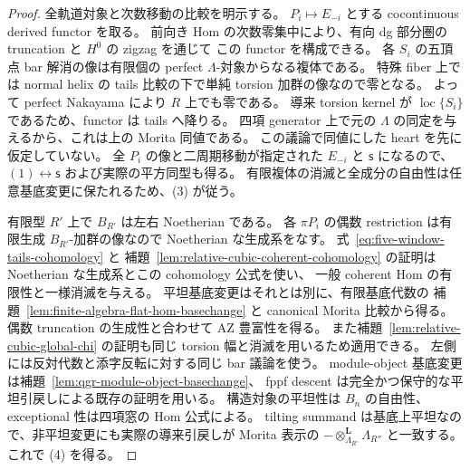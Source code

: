 \begin{proof}
全軌道対象と次数移動の比較を明示する。
$P_i\mapsto E_{-i}$ とする cocontinuous derived functor を取る。
前向き Hom の次数零集中により、有向 dg 部分圏の truncation と $H^0$ の zigzag を通じて
この functor を構成できる。
各 $S_i$ の五頂点 bar 解消の像は有限個の perfect $\Lambda$-対象からなる複体である。
特殊 fiber 上では normal helix の tails 比較の下で単純 torsion 加群の像なので零となる。
よって perfect Nakayama により $R$ 上でも零である。
導来 torsion kernel が $\operatorname{loc}\{S_i\}$ であるため、functor は tails へ降りる。
四項 generator 上で元の $\Lambda$ の同定を与えるから、これは上の Morita 同値である。
この議論で同値にした heart を先に仮定していない。
全 $P_i$ の像と二周期移動が指定された $E_{-i}$ と $\mathsf s$ になるので、
$(1)\leftrightarrow\mathsf s$ および実際の平方同型も得る。
有限複体の消滅と全成分の自由性は任意基底変更に保たれるため、(3) が従う。

有限型 $R'$ 上で $B_{R'}$ は左右 Noetherian である。
各 $\pi P_i$ の偶数 restriction は有限生成 $B_{R'}$-加群の像なので
Noetherian な生成系をなす。
式~\eqref{eq:five-window-tails-cohomology} と
補題~\ref{lem:relative-cubic-coherent-cohomology} の証明は
Noetherian な生成系とこの cohomology 公式を使い、
一般 coherent Hom の有限性と一様消滅を与える。
平坦基底変更はそれとは別に、有限基底代数の
補題~\ref{lem:finite-algebra-flat-hom-basechange} と
canonical Morita 比較から得る。
偶数 truncation の生成性と合わせて AZ 豊富性を得る。
また補題~\ref{lem:relative-cubic-global-chi} の証明も同じ torsion 幅と消滅を用いるため適用できる。
左側には反対代数と添字反転に対する同じ bar 議論を使う。
module-object 基底変更は補題~\ref{lem:qgr-module-object-basechange}、
fppf descent は完全かつ保守的な平坦引戻しによる既存の証明を用いる。
構造対象の平坦性は $B_n$ の自由性、exceptional 性は四項窓の Hom 公式による。
tilting summand は基底上平坦なので、非平坦変更にも実際の導来引戻しが
Morita 表示の $-\otimes_{\Lambda_{R'}}^{\mathbf L}\Lambda_{R''}$ と一致する。
これで (4) を得る。
\end{proof}


